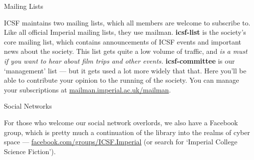 \vspace{2mm} {\Large Mailing Lists}

ICSF maintains two mailing lists, which all members are welcome to subscribe to.
Like all official Imperial mailing lists, they use mailman.
%
\textbf{icsf-list} is the society's core mailing list, which contains
announcements of ICSF events and important news about the society.
This list gets quite a low volume of traffic, and \textit{is a must if
you want to hear about film trips and other events.}
%
\textbf{icsf-committee} is our `management' list --- but it gets used a
lot more widely that that. Here you'll be able to contribute your opinion
to the running of the society.
%
You can manage your subscriptions at \url{mailman.imperial.ac.uk/mailman}.

{\large Social Networks}

For those who welcome our social network overlords, we also have a Facebook
group, which is pretty much a continuation of the library into the
realms of cyber space --- \url{facebook.com/groups/ICSF.Imperial} (or search for
`Imperial College Science Fiction').

\vspace{-10mm}
